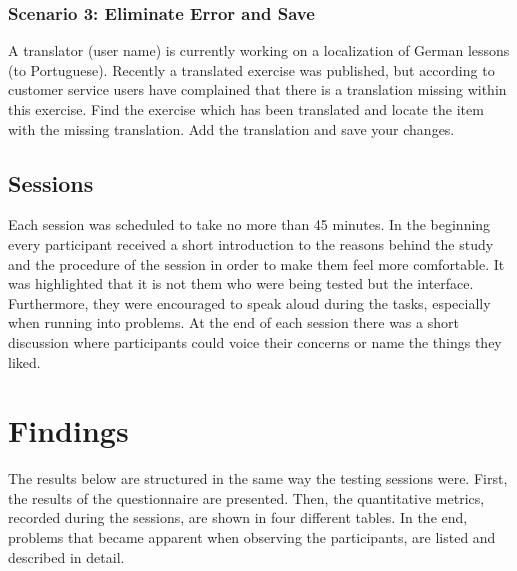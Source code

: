 \subsubsection{Scenario 3: Eliminate Error and Save}
A translator (user name) is currently working on a localization of German lessons (to Portuguese). Recently a translated exercise was published, but according to customer service users have complained that there is a translation missing within this exercise. Find the exercise which has been translated and locate the item with the missing translation. Add the translation and save your changes.

\subsection{Sessions}
Each session was scheduled to take no more than 45 minutes. In the beginning every participant received a short introduction to the reasons behind the study and the procedure of the session in order to make them feel more comfortable. It was highlighted that it is not them who were being tested but the interface. Furthermore, they were encouraged to speak aloud during the tasks, especially when running into problems. At the end of each session there was a short discussion where participants could voice their concerns or name the things they liked.

\clearpage

\section{Findings}
The results below are structured in the same way the testing sessions were. First, the results of the questionnaire are presented. Then, the quantitative metrics, recorded during the sessions, are shown in four different tables. In the end, problems that became apparent when observing the participants, are listed and described in detail.


